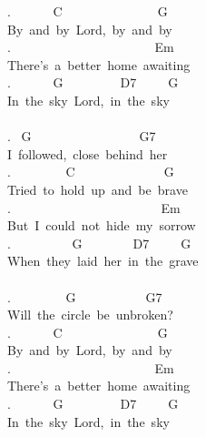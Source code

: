 {. \ \ \ \ \ \ C\ \ \ \ \ \ \ \ \ \ \ \ \ \ \ G\\
By\ and\ by\ Lord,\ by\ and\ by\\
. \ \ \ \ \ \ \ \ \ \ \ \ \ \ \ \ \ \ \ \ \ \ Em\\
There's\ a\ better\ home\ awaiting\\
. \ \ \ \ \ \ G\ \ \ \ \ \ \ \ \ D7\ \ \ \ \ G\\
In\ the\ sky\ Lord,\ in\ the\ sky\\
\\
. \ G\ \ \ \ \ \ \ \ \ \ \ \ \ \ \ \ \ G7\\
I\ followed,\ close\ behind\ her\\
. \ \ \ \ \ \ \ \ C\ \ \ \ \ \ \ \ \ \ \ \ \ \ G\\
Tried\ to\ hold\ up\ and\ be\ brave\\
. \ \ \ \ \ \ \ \ \ \ \ \ \ \ \ \ \ \ \ \ \ \ \ Em\\
But\ I\ could\ not\ hide\ my\ sorrow\\
. \ \ \ \ \ \ \ \ \ G\ \ \ \ \ \ \ \ D7\ \ \ \ \ G\\
When\ they\ laid\ her\ in\ the\ grave\\
\\
. \ \ \ \ \ \ \ \ G\ \ \ \ \ \ \ \ \ \ \ G7\\
Will\ the\ circle\ be\ unbroken?\\
. \ \ \ \ \ \ C\ \ \ \ \ \ \ \ \ \ \ \ \ \ \ G\\
By\ and\ by\ Lord,\ by\ and\ by\\
. \ \ \ \ \ \ \ \ \ \ \ \ \ \ \ \ \ \ \ \ \ \ Em\\
There's\ a\ better\ home\ awaiting\\
. \ \ \ \ \ \ G\ \ \ \ \ \ \ \ \ D7\ \ \ \ \ G\\
In\ the\ sky\ Lord,\ in\ the\ sky}

